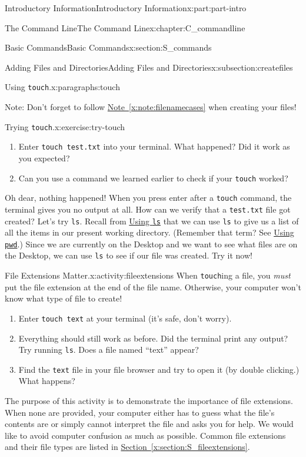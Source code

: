 \documentclass[oneside,10pt,]{book}
\newcommand{\xreffont}{\relax}
\newcommand{\mono}[1]{\texttt{#1}}
\begin{document}
\begin{partptx}{Introductory Information}{}{Introductory Information}{}{}{x:part:part-intro}
\begin{chapterptx}{The Command Line}{}{The Command Line}{}{}{x:chapter:C_commandline}
\begin{sectionptx}{Basic Commands}{}{Basic Commands}{}{}{x:section:S_commands}
\begin{subsectionptx}{Adding Files and Directories}{}{Adding Files and Directories}{}{}{x:subsection:createfiles}
\begin{paragraphs}{Using \mono{touch}.}{x:paragraphs:touch}
\par
Note: Don't forget to follow \hyperref[x:note:filenamecases]{Note~{\xreffont\ref{x:note:filenamecases}}} when creating your files!%
\begin{inlineexercise}{Trying \mono{touch}.}{x:exercise:try-touch}%
\begin{enumerate}[font=\bfseries,label=(\alph*),ref=\alph*]
\item{}Enter \mono{touch test.txt} into your terminal. What happened? Did it work as you expected?%
\item{}Can you use a command we learned earlier to check if your \mono{touch} worked?%
\end{enumerate}
\end{inlineexercise}%
Oh dear, nothing happened! When you press enter after a \mono{touch} command, the terminal gives you no output at all. How can we verify that a \mono{test.txt} file got created? Let's try \mono{ls}. Recall from \hyperlink{x:paragraphs:ls}{Using \mono{ls}} that we can use \mono{ls} to give us a list of all the items in our present working directory. (Remember that term? See \hyperlink{x:paragraphs:pwd}{Using \mono{pwd}}.) Since we are currently on the Desktop and we want to see what files are on the Desktop, we can use \mono{ls} to see if our file was created. Try it now!%
\begin{activity}{File Extensions Matter.}{x:activity:fileextensions}%
%
%
When \mono{touch}ing a file, you \emph{must} put the file extension at the end of the file name. Otherwise, your computer won't know what type of file to create!%
\begin{enumerate}[font=\bfseries,label=(\alph*),ref=\alph*]
\item{}Enter \mono{touch text} at your terminal (it's safe, don't worry).%
\item{}Everything should still work as before. Did the terminal print any output? Try running \mono{ls}. Does a file named ``text'' appear?%
\item{}Find the \mono{text} file in your file browser and try to open it (by double clicking.) What happens?%
\end{enumerate}
The purpose of this activity is to demonstrate the importance of file extensions. When none are provided, your computer either has to guess what the file's contents are or simply cannot interpret the file and asks you for help. We would like to avoid computer confusion as much as possible. Common file extensions and their file types are listed in \hyperref[x:section:S_fileextensions]{Section~{\xreffont\ref{x:section:S_fileextensions}}}.%

\end{activity}
\end{paragraphs}
\end{subsectionptx}
\end{sectionptx}
\end{chapterptx}
\end{partptx}
\end{document}
